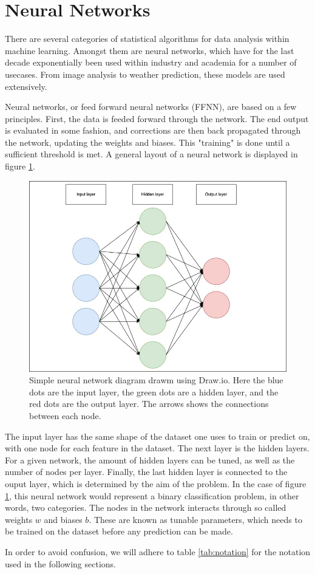 \section*{Neural Networks}
There are several categories of statistical algorithms for data analysis within machine learning.
Amongst them are neural networks, which have for the last decade exponentially been used
within industry and academia for a number of usecases. From image analysis to weather prediction,
these models are used extensively. \par
Neural networks, or feed forward neural networks (FFNN), are based on a few principles.
First, the data is feeded forward through the network. The end output is evaluated in some fashion, 
and corrections are then back propagated through the network, updating the weights and biases. 
This "training" is done until a sufficient threshold is met. A general layout of a neural network is displayed in
figure \ref{fig:nndiagram}.

\begin{figure}
    \includegraphics[width=\linewidth]{Figures/Machinelearning/nn_diagram.jpeg}
    \caption{Simple neural network diagram drawm using Draw.io. Here the blue dots are the input layer, the green dots are a hidden layer, 
    and the red dots are the output layer. The arrows shows the connections between each node. }
    \label{fig:nndiagram}
\end{figure}

The input layer has the same shape of the dataset one uses to train or predict on, with one node for each feature in the dataset.
The next layer is the hidden layers. For a given network, the amount of hidden layers can be tuned, as well as the number of 
nodes per layer. Finally, the last hidden layer is connected to the ouput layer, which is determined by the aim of the problem. 
In the case of figure \ref{fig:nndiagram}, this neural network would represent a binary classification problem, in other words, two categories. 
The nodes in the network interacts through so called weights $w$ and biases $b$. These are known as tunable parameters, 
which needs to be trained on the dataset before any prediction can be made. \par 
In order to avoid confusion, we will adhere to table \ref{tab:notation} for the notation used in the following sections.

